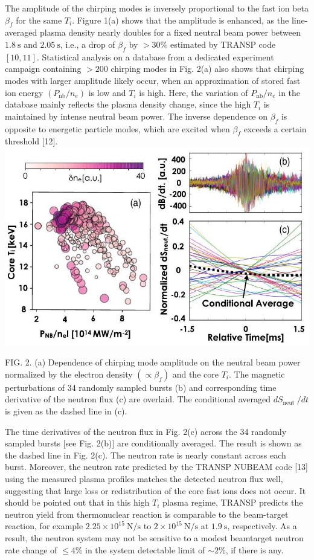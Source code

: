 \documentclass[10pt]{article}
\begin{document}
The amplitude of the chirping modes is inversely proportional to the fast ion beta $\beta_{f}$ for the same $T_{i}$. Figure 1(a) shows that the amplitude is enhanced, as the line-averaged plasma density nearly doubles for a fixed neutral beam power between $1.8 \mathrm{~s}$ and $2.05 \mathrm{~s}$, i.e., a drop of $\beta_{f}$ by $>30 \%$ estimated by TRANSP code $[10,11]$. Statistical analysis on a database from a dedicated experiment campaign containing $>200$ chirping modes in Fig. 2(a) also shows that chirping modes with larger amplitude likely occur, when an approximation of stored fast ion energy $\left(P_{\mathrm{nb}} / n_{e}\right)$ is low and $T_{i}$ is high. Here, the variation of $P_{\mathrm{nb}} / n_{e}$ in the database mainly reflects the plasma density change, since the high $T_{i}$ is maintained by intense neutral beam power. The inverse dependence on $\beta_{f}$ is opposite to energetic particle modes, which are excited when $\beta_{f}$ exceeds a certain threshold [12].
\includegraphics[max width=\textwidth, center]{2023_06_19_f8dbb752866ca158c73eg-2}

FIG. 2. (a) Dependence of chirping mode amplitude on the neutral beam power normalized by the electron density $\left(\propto \beta_{f}\right)$ and the core $T_{i}$. The magnetic perturbations of 34 randomly sampled bursts (b) and corresponding time derivative of the neutron flux (c) are overlaid. The conditional averaged $d S_{\text {neut }} / d t$ is given as the dashed line in (c).

The time derivatives of the neutron flux in Fig. 2(c) across the 34 randomly sampled bursts [see Fig. 2(b)] are conditionally averaged. The result is shown as the dashed line in Fig. 2(c). The neutron rate is nearly constant across each burst. Moreover, the neutron rate predicted by the TRANSP NUBEAM code [13] using the measured plasma profiles matches the detected neutron flux well, suggesting that large loss or redistribution of the core fast ions does not occur. It should be pointed out that in this high $T_{i}$ plasma regime, TRANSP predicts the neutron yield from thermonuclear reaction is comparable to the beam-target reaction, for example $2.25 \times 10^{15} \mathrm{~N} / \mathrm{s}$ to $2 \times 10^{15} \mathrm{~N} / \mathrm{s}$ at $1.9 \mathrm{~s}$, respectively. As a result, the neutron system may not be sensitive to a modest beamtarget neutron rate change of $\leq 4 \%$ in the system detectable limit of $\sim 2 \%$, if there is any.
\end{document}
